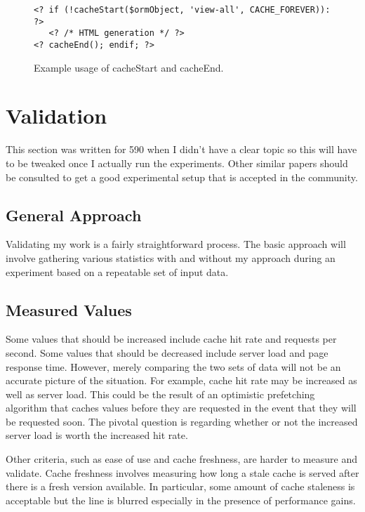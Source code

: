 \documentclass[12pt]{ucthesis}
\begin{document}
\begin{figure}[h]
\begin{verbatim}
<? if (!cacheStart($ormObject, 'view-all', CACHE_FOREVER)): ?>
   <? /* HTML generation */ ?>
<? cacheEnd(); endif; ?>
\end{verbatim}
\caption{Example usage of cacheStart and cacheEnd.}
\label{fig:cacheStartExample}
\end{figure}

\chapter{Validation}
\label{validation}
This section was written for 590 when I didn't have a clear topic so this will have to be tweaked once I actually run the experiments.
Other similar papers should be consulted to get a good experimental setup that is accepted in the community.

\section{General Approach}
Validating my work is a fairly straightforward process.
The basic approach will involve gathering various statistics with and without my approach during an experiment based on a repeatable set of input data. %

\section{Measured Values}
Some values that should be increased include cache hit rate and requests per second.
Some values that should be decreased include server load and page response time.
However, merely comparing the two sets of data will not be an accurate picture of the situation.
For example, cache hit rate may be increased as well as server load.
This could be the result of an optimistic prefetching algorithm that caches values before they are requested in the event that they will be requested soon.
The pivotal question is regarding whether or not the increased server load is worth the increased hit rate.

Other criteria, such as ease of use and cache freshness, are harder to measure and validate.
Cache freshness involves measuring how long a stale cache is served after there is a fresh version available.
In particular, some amount of cache staleness is acceptable but the line is blurred especially in the presence of performance gains.
\end{document}
